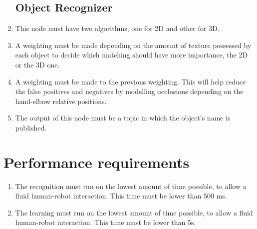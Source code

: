 \documentclass{article}
\makeatletter
\def\threedigits#1{\expandafter\@threedigits\csname c@#1\endcsname}
\def\@threedigits#1{%
  \ifnum#1<100 0\fi
  \ifnum#1<10 0\fi
  \number#1}
\makeatother
\begin{document}
\begin{enumerate}[label=\textbf{FR\threedigits*}, leftmargin=2cm]
\subsection{Object Recognizer}
	\item This node must have two algorithms, one for 2D and other for 3D. 
	\item A weighting must be made depending on the amount of texture possessed by each object to decide which matching should have more importance, the 2D or the 3D one. 
	\item A weighting must be made to the previous weighting. This will help reduce the false positives and negatives by modelling occlusions depending on the hand-elbow relative positions. 
	\item The output of this node must be a topic in which the object's name is published.
	






\end{enumerate}



\section{Performance requirements}

\begin{enumerate}[label=\textbf{PR\threedigits*}]
\item The recognition must run on the lowest amount of time possible, to allow a fluid human-robot interaction. This time must be lower than 500 ms. 
\item The learning must run on the lowest amount of time possible, to allow a fluid human-robot interaction. This time must be lower than 5s. 
\end{enumerate}


\end{document}

